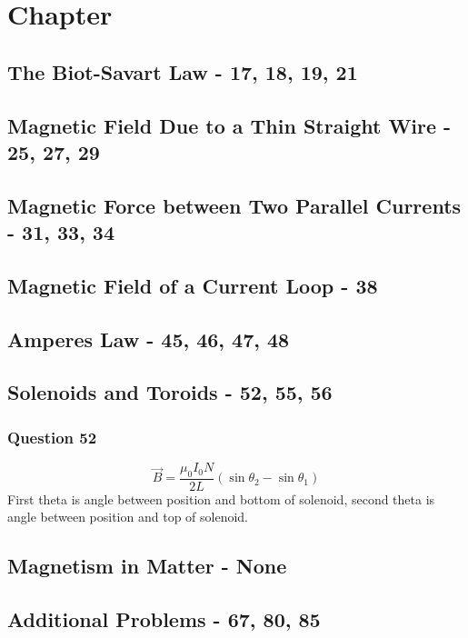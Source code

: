 \documentclass[12pt, letterpaper, twoside]{article}
\begin{document}
\section{Chapter }

  \subsection{The Biot-Savart Law - 17, 18, 19, 21}
  
  \subsection{Magnetic Field Due to a Thin Straight Wire - 25, 27, 29}

  \subsection{Magnetic Force between Two Parallel Currents - 31, 33, 34}
  
  \subsection{Magnetic Field of a Current Loop - 38}
  
  \subsection{Amperes Law - 45, 46, 47, 48}
  
  \subsection{Solenoids and Toroids - 52, 55, 56}
    \subsubsection*{Question 52}
	  $$\vec{B} = \frac{\mu_0I_0N}{2L}(\sin \theta_2 - \sin \theta_1)$$
	  First theta is angle between position and bottom of solenoid, second theta is angle between position and top of solenoid.
      
  
  \subsection{Magnetism in Matter - None}
  
  \subsection*{Additional Problems - 67, 80, 85}
\end{document}
